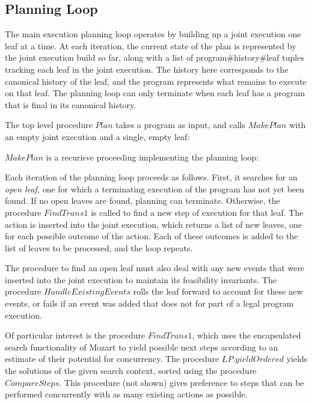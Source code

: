 

\subsection{Planning Loop}

The main execution planning loop operates by building up a joint execution
one leaf at a time. At each iteration, the current state of the plan
is represented by the joint execution build so far, along with a list
of program\#history\#leaf tuples tracking each leaf in the joint execution.
The history here corresponds to the canonical history of the leaf,
and the program represents what remains to execute on that leaf. The
planning loop can only terminate when each leaf has a program that
is final in its canonical history.

The top level procedure $Plan$ takes a program as input, and calls
$MakePlan$ with an empty joint execution and a single, empty leaf:


$MakePlan$ is a recurisve proceeding implementing the planning loop:


Each iteration of the planning loop proceeds as follows. First, it
searches for an \emph{open leaf,} one for which a terminating execution
of the program has not yet been found. If no open leaves are found,
planning can terminate. Otherwise, the procedure $FindTrans1$ is
called to find a new step of execution for that leaf. The action is
inserted into the joint execution, which returns a list of new leaves,
one for each possible outcome of the action. Each of these outcomes
is added to the list of leaves to be processed, and the loop repeats.

The procedure to find an open leaf must also deal with any new events
that were inserted into the joint execution to maintain its feasibility
invariants. The procedure $HandleExistingEvents$ rolls the leaf forward
to account for these new events, or fails if an event was added that
does not for part of a legal program execution.


Of particular interest is the procedure $FindTrans1$, which uses
the encapsulated search functionality of Mozart to yield possible
next steps according to an estimate of their potential for concurrency.
The procedure $LP.yieldOrdered$ yields the solutions of the given
search context, sorted using the procedure $CompareSteps$. This procedure
(not shown) gives preference to steps that can be performed concurrently
with as many existing actions as possible.

